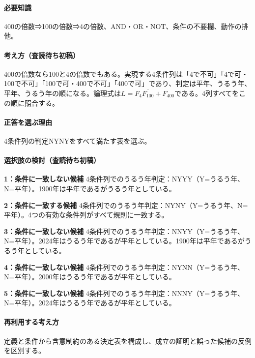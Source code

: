 \paragraph{必要知識} 400の倍数⇒100の倍数⇒4の倍数、AND・OR・NOT、条件の不要欄、動作の排他。

\paragraph{考え方（査読待ち初稿）} 400の倍数なら100と4の倍数でもある。実現する4条件列は「4で不可」「4で可・100で不可」「100で可・400で不可」「400で可」であり、判定は平年、うるう年、平年、うるう年の順になる。論理式は\(L=F_4\overline{F_{100}}+F_{400}\)である。4列すべてをこの順に照合する。

\paragraph{正答を選ぶ理由} 4条件列の判定NYNYをすべて満たす表を選ぶ。

\paragraph{選択肢の検討（査読待ち初稿）}\mbox{}\par

\noindent\textbf{1：条件に一致しない候補} 4条件列でのうるう年判定：NYYY（Y=うるう年、N=平年）。1900年は平年であるがうるう年としている。\par

\noindent\textbf{2：条件に一致する候補} 4条件列でのうるう年判定：NYNY（Y=うるう年、N=平年）。4つの有効な条件列がすべて規則に一致する。\par

\noindent\textbf{3：条件に一致しない候補} 4条件列でのうるう年判定：NNYY（Y=うるう年、N=平年）。2024年はうるう年であるが平年としている。1900年は平年であるがうるう年としている。\par

\noindent\textbf{4：条件に一致しない候補} 4条件列でのうるう年判定：NYNN（Y=うるう年、N=平年）。2000年はうるう年であるが平年としている。\par

\noindent\textbf{5：条件に一致しない候補} 4条件列でのうるう年判定：NNNY（Y=うるう年、N=平年）。2024年はうるう年であるが平年としている。\par

\paragraph{再利用する考え方} 定義と条件から含意制約のある決定表を構成し、成立の証明と誤った候補の反例を区別する。

